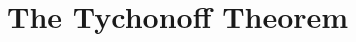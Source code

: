 \documentclass[../main.tex]{subfiles}
\begin{document}
\chapter{The Tychonoff Theorem}
%
\todo{}
\end{document}
